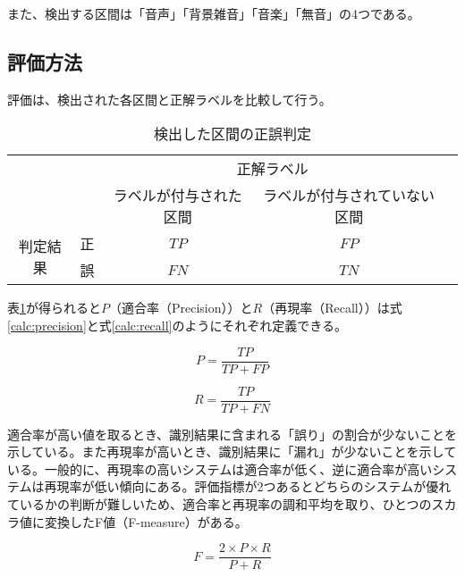 また、検出する区間は「音声」「背景雑音」「音楽」「無音」の4つである。

\subsection{評価方法}
評価は、検出された各区間と正解ラベルを比較して行う。

\begin{table}[H]
\begin{center}
    \caption{検出した区間の正誤判定 \label{table:search_table}}
\begin{tabular}{|c|c|c|c|l}
\cline{1-4}
\multicolumn{2}{|c|}{\multirow{2}{*}{}} & \multicolumn{2}{c|}{正解ラベル} &  \\ \cline{3-4}
\multicolumn{2}{|c|}{}                  & ラベルが付与された区間        &    ラベルが付与されていない区間     &  \\ \cline{1-4}
\multirow{2}{*}{判定結果}        & 正        & $TP$                  & $FP$                   &  \\ \cline{2-4}
& 誤        & $FN$                  & $TN$                   &  \\ \cline{1-4}
\end{tabular}
\end{center}
\end{table}

表\ref{table:search_table}が得られると$P$（適合率（Precision））と$R$（再現率（Recall））は式\ref{calc:precision}と式\ref{calc:recall}のようにそれぞれ定義できる。

\begin{equation}
\label{calc:precision}
P = \frac{TP}{TP + FP}
\end{equation}

\begin{equation}
\label{calc:recall}
R = \frac{TP}{TP + FN}
\end{equation}

適合率が高い値を取るとき、識別結果に含まれる「誤り」の割合が少ないことを示している。また再現率が高いとき、識別結果に「漏れ」が少ないことを示している。一般的に、再現率の高いシステムは適合率が低く、逆に適合率が高いシステムは再現率が低い傾向にある。評価指標が2つあるとどちらのシステムが優れているかの判断が難しいため、適合率と再現率の調和平均を取り、ひとつのスカラ値に変換したF値（F-measure）がある。

\begin{equation}
\label{calc:fmeasure}
F = \frac{2 \times P \times R}{P + R}
\end{equation}

